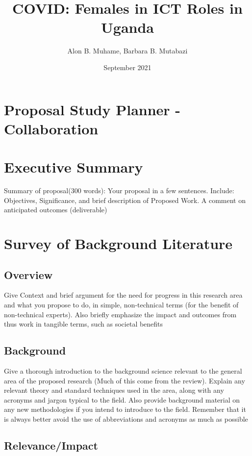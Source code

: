 \documentclass{article}
\title{COVID: Females in ICT Roles in Uganda}
\author{Alon B. Muhame, Barbara B. Mutabazi }
\date{September 2021}
\begin{document}
\maketitle

\section*{Proposal Study Planner - Collaboration}

\section{Executive Summary}

Summary of proposal(300 words): Your proposal in a few sentences. Include: Objectives, Significance, and brief description of Proposed Work. A comment on anticipated outcomes (deliverable)

\section{Survey of Background Literature}

\subsection{Overview}

Give Context and brief argument for the need for progress in this research area and what you propose to do, in simple, non-technical terms (for the benefit of non-technical experts). Also briefly emphasize the impact and outcomes from thus work in tangible terms, such as societal benefits
\subsection{Background}

Give a thorough introduction to the background science relevant to the general area of the proposed research (Much of this come from the review). Explain any relevant theory and standard techniques used in the area, along with any acronyms and jargon typical to the field. Also provide background material on any new methodologies if you intend to introduce to the field. Remember that it is always better avoid the use of abbreviations and acronyms as much as possible

\subsection{Relevance/Impact}
\end{document}
